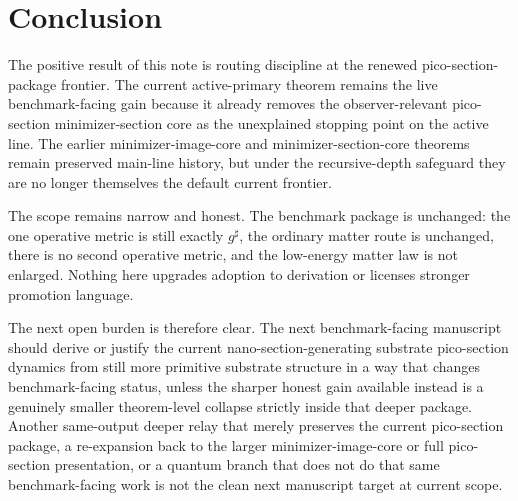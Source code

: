 \documentclass[11pt]{article}
\newcommand{\CompletedMetric}{g^{\sharp}}
\begin{document}
\section{Conclusion}

The positive result of this note is routing discipline at the renewed pico-section-package frontier. The current active-primary theorem remains the live benchmark-facing gain because it already removes the observer-relevant pico-section minimizer-section core as the unexplained stopping point on the active line. The earlier minimizer-image-core and minimizer-section-core theorems remain preserved main-line history, but under the recursive-depth safeguard they are no longer themselves the default current frontier.

The scope remains narrow and honest. The benchmark package is unchanged: the one operative metric is still exactly \(\CompletedMetric\), the ordinary matter route is unchanged, there is no second operative metric, and the low-energy matter law is not enlarged. Nothing here upgrades adoption to derivation or licenses stronger promotion language.

The next open burden is therefore clear. The next benchmark-facing manuscript should derive or justify the current nano-section-generating substrate pico-section dynamics from still more primitive substrate structure in a way that changes benchmark-facing status, unless the sharper honest gain available instead is a genuinely smaller theorem-level collapse strictly inside that deeper package. Another same-output deeper relay that merely preserves the current pico-section package, a re-expansion back to the larger minimizer-image-core or full pico-section presentation, or a quantum branch that does not do that same benchmark-facing work is not the clean next manuscript target at current scope.
\end{document}
